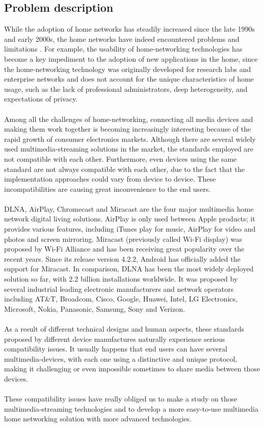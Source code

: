 \subsection{Problem description}
While the adoption of home networks has steadily increased since the late 1990s
and early 2000s, the home networks have indeed encountered problems and limitations
\cite{stateofHN}. For example, the usability of home-networking technologies has become
a key impediment to the adoption of new applications in the home, since the home-networking technology was originally developed for
 research labs and enterprise networks and does not account for the unique
 characteristics of home usage, such as the lack of professional administrators, deep
heterogeneity, and expectations of privacy.\\
\\
Among all the challenges of home-networking, connecting all media devices and making them work together is becoming increasingly interesting because of the rapid growth of consumer electronics markets. Although there are
 several widely used multimedia-streaming solutions in the market, the 
standards employed are not compatible with each other. Furthermore, even devices using
the same standard are not always compatible with each other, due to the fact
that the implementation approaches could vary from device to device. These
incompatibilities are causing great inconvenience to the end users.\\
\\
DLNA, AirPlay, Chromecast and Miracast are the four major multimedia home network
digital living solutions. AirPlay is only used between Apple products; it
provides various features, including iTunes play for music, AirPlay for video
and photos and screen mirroring. Miracast (previously called Wi-Fi display) was
proposed by Wi-Fi Alliance and has been receiving great popularity over the recent years.
Since its release version 4.2.2, Android has officially added the support for Miracast. In comparison, DLNA has been the most widely deployed solution so far, with 2.2 billion installations worldwide.
It was proposed by several industrial leading electronic manufacturers and network operators 
including AT$\&$T, Broadcom, Cisco, Google, Huawei, Intel, LG Electronics, Microsoft, Nokia, 
Panasonic, Samsung, Sony and Verizon.\\
\\
As a result of different technical designs and  human aspects, these standards proposed by
different device manufactures naturally experience serious compatibility issues. It usually happens that
end users can have several multimedia-devices, with each one using a
distinctive and unique  protocol, making it challenging or even impossible
sometimes to share media between those devices.\\
\\
These compatibility issues have really obliged us to make a study on those multimedia-streaming
 technologies and to develop a more easy-to-use multimedia home networking solution
 with more  advanced technologies.

